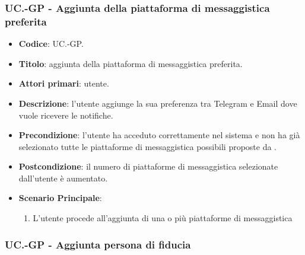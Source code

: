 	\subsubsection{UC\theuccount.\thesubuccount-GP - Aggiunta della piattaforma di messaggistica preferita}
		
		\begin{itemize}
			\item \textbf{Codice}: UC\theuccount.\thesubuccount-GP.
			\item \textbf{Titolo}: aggiunta della piattaforma di messaggistica preferita.
			\item \textbf{Attori primari}: utente.
			\item \textbf{Descrizione}: l’utente aggiunge la sua preferenza tra Telegram e Email dove vuole ricevere le notifiche.
			\item \textbf{Precondizione}: l’utente ha acceduto correttamente nel sistema e non ha già selezionato tutte le piattaforme di messaggistica possibili proposte da \progetto.
			\item \textbf{Postcondizione}: il numero di piattaforme di messaggistica selezionate dall’utente è aumentato.
			\item \textbf{Scenario Principale}:
			\begin{enumerate}
				\item L'utente procede all'aggiunta di una o più piattaforme di messaggistica
			\end{enumerate}
		\end{itemize}
	
	\subsubsection{UC\theuccount.\thesubuccount-GP - Aggiunta persona di fiducia}
		
